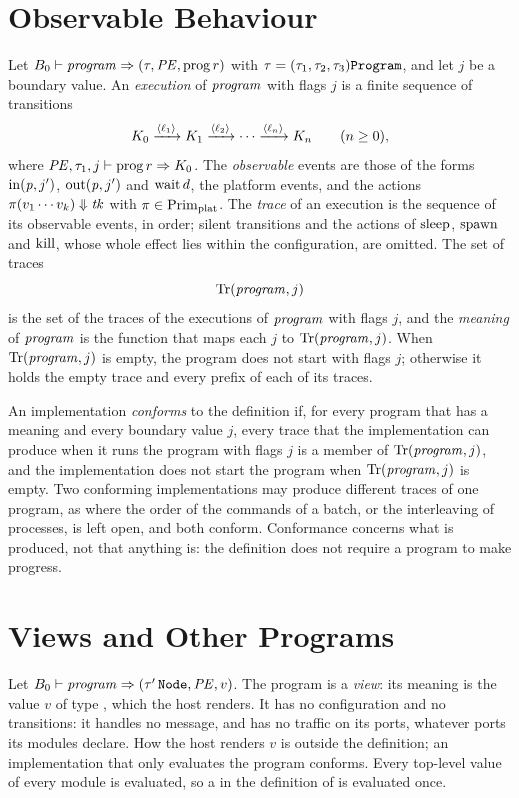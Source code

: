 \section{Observable Behaviour}\label{sec:programs-behaviour}

Let $B_0 \vdash \mathit{program} \Rightarrow (\tau,\mathit{PE},\mathrm{prog}\,r)$ with
$\tau=(\tau_1,\tau_2,\tau_3)\mathtt{Program}$, and let $j$ be a boundary value. An
\emph{execution} of $\mathit{program}$ with flags $j$ is a finite sequence of
transitions
\[
  K_0\xrightarrow{\langle \ell_1\rangle}K_1\xrightarrow{\langle \ell_2\rangle}\cdots\xrightarrow{\langle \ell_n\rangle}K_n
  \qquad(n\geq 0),
\]
where $\mathit{PE},\tau_1,j \vdash \mathrm{prog}\,r \Rightarrow K_0$. The \emph{observable} events
are those of the forms $\mathrm{in}(\mathit{p},j')$, $\mathrm{out}(\mathit{p},j')$ and
$\mathrm{wait}\,d$, the platform events, and the actions
$\pi(v_1\cdots v_k)\Downarrow \mathit{tk}$ with $\pi\in\mathrm{Prim}_{\mathrm{plat}}$. The
\emph{trace} of an execution is the sequence of its observable events, in
order; silent transitions and the actions of $\mathrm{sleep}$, $\mathrm{spawn}$ and
$\mathrm{kill}$, whose whole effect lies within the configuration, are omitted.
The set of traces
\[
  \mathrm{Tr}(\mathit{program},j)
\]
is the set of the traces of the executions of $\mathit{program}$ with flags $j$, and
the \emph{meaning} of $\mathit{program}$ is the function that maps each $j$ to
$\mathrm{Tr}(\mathit{program},j)$. When $\mathrm{Tr}(\mathit{program},j)$ is empty, the program does not
start with flags $j$; otherwise it holds the empty trace and every prefix of
each of its traces.

An implementation \emph{conforms} to the definition if, for every program
that has a meaning and every boundary value $j$, every trace that the
implementation can produce when it runs the program with flags $j$ is a
member of $\mathrm{Tr}(\mathit{program},j)$, and the implementation does not start the
program when $\mathrm{Tr}(\mathit{program},j)$ is empty. Two conforming implementations may
produce different traces of one program, as where the order of the commands
of a batch, or the interleaving of processes, is left open, and both conform.
Conformance concerns what is produced, not that anything is: the definition
does not require a program to make progress. %

\section{Views and Other Programs}\label{sec:programs-views}

Let $B_0 \vdash \mathit{program} \Rightarrow (\tau'\,\mathtt{Node},\mathit{PE},v)$. The program is a
\emph{view}: its meaning is the value $v$ of type , which the host
renders. %
It has no configuration and no transitions: it handles no message, and has no
traffic on its ports, whatever ports its modules declare. How the host
renders $v$ is outside the definition; an implementation that only evaluates
the program conforms. Every top-level value of every module is evaluated, so
a  in the definition of  is evaluated once.

